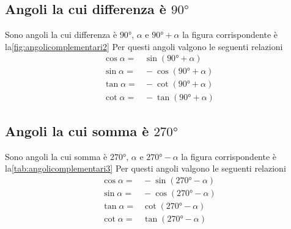 \subsection{Angoli la cui differenza è $\ang{90}$}
Sono angoli la cui differenza è $\ang{90}$, $\alpha$ e $\ang{90}+\alpha$ la figura corrispondente è la\nobs\vref{fig:angolicomplementari2}
%	
Per questi angoli valgono le seguenti relazioni
\begin{align*}
\cos\alpha=&{}\sin(\ang{90}+\alpha)\\
\sin\alpha=&{}-\cos(\ang{90}+\alpha)\\
\tan\alpha=&{}-\cot(\ang{90}+\alpha)\\
\cot\alpha=&{}-\tan(\ang{90}+\alpha)
\end{align*}
\subsection{Angoli la cui somma è $\ang{270}$}
Sono angoli la cui somma è $\ang{270}$, $\alpha$ e $\ang{270}-\alpha$ la figura corrispondente è la\nobs\vref{tab:angolicomplementari3}
%		
Per questi angoli valgono le seguenti relazioni
\begin{align*}
\cos\alpha=&{}-\sin(\ang{270}-\alpha)\\
\sin\alpha=&{}-\cos(\ang{270}-\alpha)\\
\tan\alpha=&{}\cot(\ang{270}-\alpha)\\
\cot\alpha=&{}\tan(\ang{270}-\alpha)
\end{align*}
